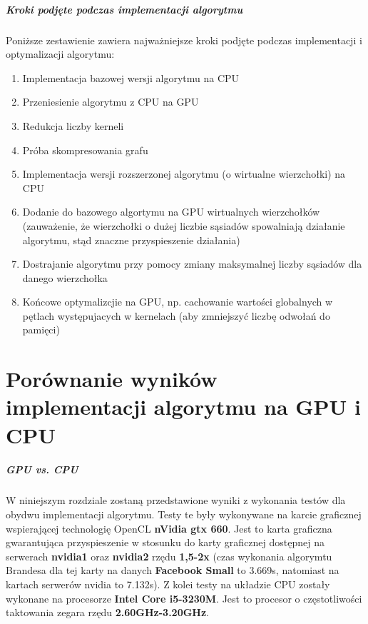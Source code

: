 \documentclass[oneside]{book}
\begin{document}
\paragraph{Kroki podjęte podczas implementacji algorytmu} Poniższe zestawienie zawiera najważniejsze kroki podjęte podczas implementacji i optymalizacji algorytmu:

\begin{enumerate}
\item Implementacja bazowej wersji algorytmu na CPU
\item Przeniesienie algorytmu z CPU na GPU
\item Redukcja liczby kerneli
\item Próba skompresowania grafu 
\item Implementacja wersji rozszerzonej algorytmu (o wirtualne wierzchołki) na CPU
\item Dodanie do bazowego algortymu na GPU wirtualnych wierzchołków (zauważenie, że wierzchołki o dużej liczbie sąsiadów spowalniają działanie algorytmu, stąd znaczne przyspieszenie działania)
\item Dostrajanie algorytmu przy pomocy zmiany maksymalnej liczby sąsiadów dla danego wierzchołka
\item Końcowe optymalizcjie na GPU, np. cachowanie wartości globalnych w pętlach występujacych w kernelach (aby zmniejszyć liczbę odwołań do pamięci)
\end{enumerate}


\chapter{Porównanie wyników implementacji algorytmu na GPU i CPU}
\paragraph{GPU vs. CPU} W niniejszym rozdziale zostaną przedstawione wyniki z wykonania testów dla obydwu implementacji algorytmu. Testy te były wykonywane na karcie graficznej wspierającej technologię OpenCL \textbf{nVidia gtx 660}. Jest to karta graficzna gwarantująca przyspieszenie w stosunku do karty graficznej dostępnej na serwerach \textbf{nvidia1} oraz \textbf{nvidia2} rzędu \textbf{1,5-2x} (czas wykonania algorymtu Brandesa dla tej karty na danych \textbf{Facebook Small} to 3.669s, natomiast na kartach serwerów nvidia to 7.132s). Z kolei testy na układzie CPU zostały wykonane na procesorze \textbf{Intel Core i5-3230M}. Jest to procesor o częstotliwości taktowania zegara rzędu \textbf{2.60GHz-3.20GHz}.
\end{document}
